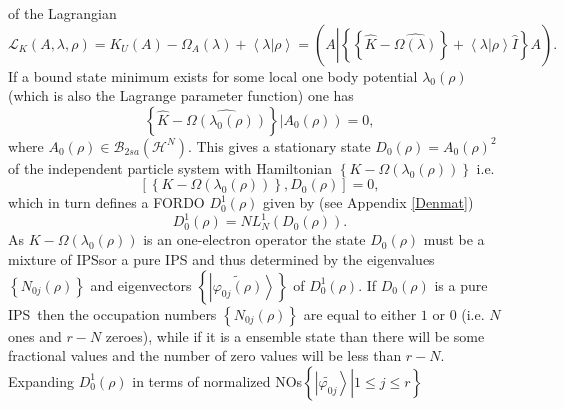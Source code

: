 \documentclass[aps,preprint]{revtex4}%
\begin{document}
of the Lagrangian
\begin{equation}
\mathcal{L}_{K}\left(  A,\lambda,\rho\right)  =K_{U}\left(  A\right)
-\Omega_{A}\left(  \lambda\right)  +\left\langle \left.  \lambda\right\vert
\rho\right\rangle =\left(  A\left\vert \left\{  \left\{  \widehat{K}%
-\widehat{\Omega\left(  \lambda\right)  }\right\}  +\left\langle \left.
\lambda\right\vert \rho\right\rangle \hat{I}\right\}  \right.  A\right)  .
\end{equation}
If a bound state minimum exists for some local one body potential $\lambda
_{0}\left(  \rho\right)  $ (which is also the Lagrange parameter function) one
has
\begin{equation}
\left\{  \widehat{K}-\widehat{\Omega\left(  \lambda_{0}\left(  \rho\right)
\right)  }\right\}  \left\vert A_{0}\left(  \rho\right)  \right)  =0,
\end{equation}
where $A_{0}\left(  \rho\right)  \in\mathcal{B}_{2sa}\left(  \mathcal{H}%
^{N}\right)  $. This gives a stationary state $D_{0}\left(  \rho\right)
=A_{0}\left(  \rho\right)  ^{2}$ of the independent particle system with
Hamiltonian $\left\{  K-\Omega\left(  \lambda_{0}\left(  \rho\right)  \right)
\right\}  $ i.e.
\begin{equation}
\left[  \left\{  K-\Omega\left(  \lambda_{0}\left(  \rho\right)  \right)
\right\}  ,D_{0}\left(  \rho\right)  \right]  =0,
\end{equation}
which in turn defines a FORDO $D_{0}^{1}\left(  \rho\right)  $ given by (see
Appendix \ref{Denmat})
\begin{equation}
D_{0}^{1}\left(  \rho\right)  =NL_{N}^{1}\left(  D_{0}\left(  \rho\right)
\right)  .
\end{equation}
As $K-\Omega\left(  \lambda_{0}\left(  \rho\right)  \right)  $ is an
one-electron operator the state $D_{0}\left(  \rho\right)  $ must be a mixture
of IPSsor a pure IPS and thus determined by the eigenvalues $\left\{
N_{0j}\left(  \rho\right)  \right\}  $ and eigenvectors $\left\{  \left\vert
\widetilde{\varphi_{0j}\left(  \rho\right)  }\right\rangle \right\}  $ of
$D_{0}^{1}\left(  \rho\right)  $. If $D_{0}\left(  \rho\right)  $ is a pure
IPS\ then the occupation numbers $\left\{  N_{0j}\left(  \rho\right)
\right\}  $ are equal to either $1$ or $0$ (i.e. $N$ ones and $r-N$ zeroes),
while if it is a ensemble state than there will be some fractional values and
the number of zero values will be less than $r-N$. Expanding $D_{0}^{1}\left(
\rho\right)  $ in terms of normalized NOs$\left\{  \left.  \left\vert
\widetilde{\varphi_{0j}}\right\rangle \right\vert 1\leq j\leq r\right\}  $
\end{document}
